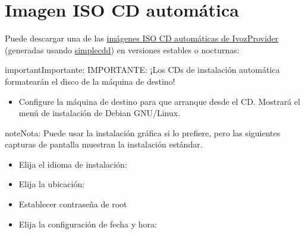\documentclass[letterpaper,10pt,spanish]{sphinxmanual}
\begin{document}
\section{Imagen ISO CD automática}
\label{basic_concepts/installation/cd_install::doc}\label{basic_concepts/installation/cd_install:automatic-iso-cd-image}\label{basic_concepts/installation/cd_install:cds-automaticos-de-instalacion}\label{basic_concepts/installation/cd_install:id1}
Puede descargar una de las \href{https://github.com/irontec/ivozprovider}{imágenes ISO CD automáticas de IvozProvider} (generadas usando \href{https://wiki.debian.org/Simple-CDD}{simplecdd}) en versiones estables o nocturnas:

\begin{notice}{important}{Importante:}
IMPORTANTE: ¡Los CDs de instalación automática formatearán el disco de la máquina de destino!
\end{notice}
\begin{itemize}
\item {} 
Configure la máquina de destino para que arranque desde el CD. Mostrará el menú de instalación de Debian GNU/Linux.

\end{itemize}

\begin{notice}{note}{Nota:}
Puede usar la instalación gráfica si lo prefiere, pero las siguientes capturas de pantalla muestran la instalación estándar.
\end{notice}

\noindent{}
\begin{itemize}
\item {} 
Elija el idioma de instalación:

\end{itemize}

\noindent{}
\begin{itemize}
\item {} 
Elija la ubicación:

\end{itemize}

\noindent{}
\begin{itemize}
\item {} 
Establecer contraseña de root

\end{itemize}

\noindent{}
\begin{itemize}
\item {} 
Elija la configuración de fecha y hora:

\end{itemize}
\end{document}
